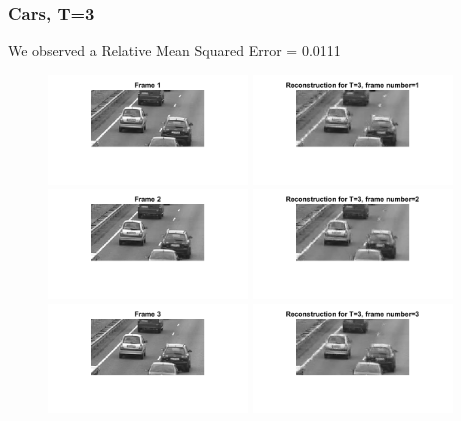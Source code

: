 \documentclass[a4paper,11pt]{article}
\numberwithin{definition}{section}
\numberwithin{mytheorem}{subsection}
\begin{document}
\newpage
\subsubsection{Cars, T=3}
We observed a Relative Mean Squared Error = 0.0111


\begin{figure}[H]
    \centering
    \includegraphics[width=200px]{"Frame 1.png"}
    \includegraphics[width=200px]{"Reconstruction- T=3, frame number=1.png"}
    \includegraphics[width=200px]{"Frame 2.png"}
    \includegraphics[width=200px]{"Reconstruction- T=3, frame number=2.png"}
    \includegraphics[width=200px]{"Frame 3.png"}
    \includegraphics[width=200px]{"Reconstruction- T=3, frame number=3.png"}
\end{figure}
\end{document}
